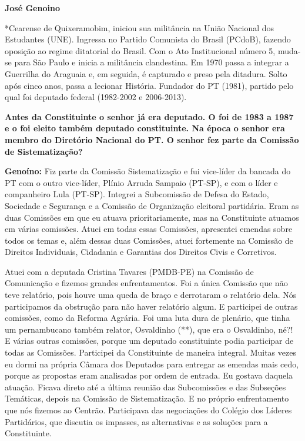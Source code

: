\textbf{José Genoino}

*Cearense de Quixeramobim, iniciou sua militância na União Nacional dos
Estudantes (UNE). Ingressa no Partido Comunista do Brasil (PCdoB),
fazendo oposição ao regime ditatorial do Brasil. Com o Ato Institucional
número 5, muda-se para São Paulo e inicia a militância clandestina. Em
1970 passa a integrar a Guerrilha do Araguaia e, em seguida, é capturado
e preso pela ditadura. Solto após cinco anos, passa a lecionar História.
Fundador do PT (1981), partido pelo qual foi deputado federal (1982-2002
e 2006-2013).

\textbf{Antes da Constituinte o senhor já era deputado. O foi de 1983 a
1987 e o foi eleito também deputado constituinte. Na época o senhor era
membro do Diretório Nacional do PT. O senhor fez parte da Comissão de
Sistematização?}

\textbf{Genoíno:} Fiz parte da Comissão Sistematização e fui vice-líder
da bancada do PT com o outro vice-líder, Plínio Arruda Sampaio (PT-SP),
e com o líder e companheiro Lula (PT-SP). Integrei a Subcomissão de
Defesa do Estado, Sociedade e Segurança e a Comissão de Organização
eleitoral partidária. Eram as duas Comissões em que eu atuava
prioritariamente, mas na Constituinte atuamos em várias comissões. Atuei
em todas essas Comissões, apresentei emendas sobre todos os temas e,
além dessas duas Comissões, atuei fortemente na Comissão de Direitos
Individuais, Cidadania e Garantias dos Direitos Civis e Corretivos.

Atuei com a deputada Cristina Tavares (PMDB-PE) na Comissão de
Comunicação e fizemos grandes enfrentamentos. Foi a única Comissão que
não teve relatório, pois houve uma queda de braço e derrotaram o
relatório dela. Nós participamos da obstrução para não haver relatório
algum. E participei de outras comissões, como da Reforma Agrária. Foi
uma luta dura de plenário, que tinha um pernambucano também relator,
Osvaldinho (**), que era o Osvaldinho, né?! E várias outras comissões,
porque um deputado constituinte podia participar de todas as Comissões.
Participei da Constituinte de maneira integral. Muitas vezes eu dormi na
própria Câmara dos Deputados para entregar as emendas mais cedo, porque
as propostas eram analisadas por ordem de entrada. Eu gostava daquela
atuação. Ficava direto até a última reunião das Subcomissões e das
Subseções Temáticas, depois na Comissão de Sistematização. E no próprio
enfrentamento que nós fizemos ao Centrão. Participava das negociações do
Colégio dos Líderes Partidários, que discutia os impasses, as
alternativas e as soluções para a Constituinte.

